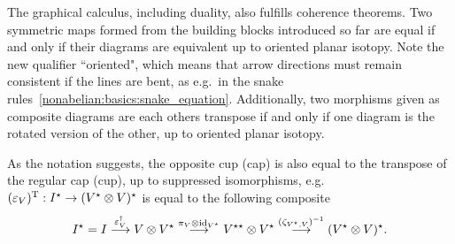 The graphical calculus, including duality, also fulfills coherence theorems.
%
Two symmetric maps formed from the building blocks introduced so far are equal if and only if their diagrams are equivalent up to oriented planar isotopy.
%
Note the new qualifier ``oriented", which means that arrow directions must remain consistent if the lines are bent, as e.g.~in the snake rules~\eqref{nonabelian:basics:snake_equation}.
%
Additionally, two morphisms given as composite diagrams are each others transpose if and only if one diagram is the rotated version of the other, up to oriented planar isotopy.

As the notation suggests, the opposite cup (cap) is also equal to the transpose of the regular cap (cup), up to suppressed isomorphisms, e.g.~$(\varepsilon_V)^{\text{T}} : I^\star \to (V^\star \otimes V)^\star$ is equal to the following composite
\begin{equation*}
    I^\star 
    = I
    \overset{\varepsilon_V^\dagger}{\longrightarrow} V \otimes V^\star
    \overset{\pi_V \otimes \mathrm{id}_{V^\star}}{\longrightarrow} V^{\star\star} \otimes V^\star
    \overset{(\zeta_{V^\star, V})^{-1}}{\longrightarrow} (V^\star \otimes V)^\star
    .
\end{equation*}


